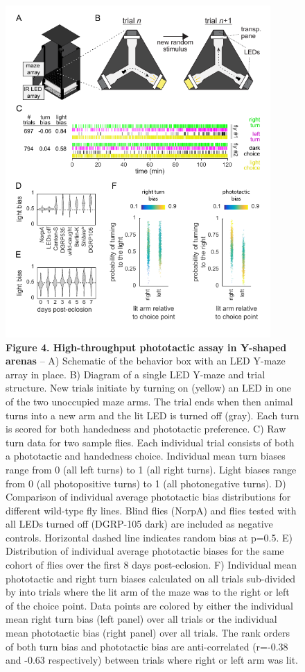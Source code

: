 \documentclass[10pt]{article}
\begin{document}
\newpage
\begin{figure}[h!]
	\begin{center}
		\includegraphics[width=0.9\textwidth]{../figures/LED_ymaze_panel_sm.pdf}
	\end{center}
	\caption*{\footnotesize \textbf{Figure 4. High-throughput phototactic assay in Y-shaped arenas} -- A) Schematic of the behavior box with an LED Y-maze array in place. B) Diagram of a single LED Y-maze and trial structure. New trials initiate by turning on (yellow) an LED in one of the two unoccupied maze arms. The trial ends when then animal turns into a new arm and the lit LED is turned off (gray). Each turn is scored for both handedness and phototactic preference. C) Raw turn data for two sample flies. Each individual trial consists of both a phototactic and handedness choice. Individual mean turn biases range from 0 (all left turns) to 1 (all right turns). Light biases range from 0 (all photopositive turns) to 1 (all photonegative turns). D) Comparison of individual average phototactic bias distributions for different wild-type fly lines. Blind flies (NorpA) and flies tested with all LEDs turned off (DGRP-105 dark) are included as negative controls. Horizontal dashed line indicates random bias at p=0.5. E) Distribution of individual average phototactic biases for the same cohort of flies over the first 8 days post-eclosion. F) Individual mean phototactic and right turn biases calculated on all trials sub-divided by into trials where the lit arm of the maze was to the right or left of the choice point. Data points are colored by either the individual mean right turn bias (left panel) over all trials or the individual mean phototactic bias (right panel) over all trials. The rank orders of both turn bias and phototactic bias are anti-correlated (r=-0.38 and -0.63  respectively) between trials where right or left arm was lit.}
\end{figure}
\end{document}
